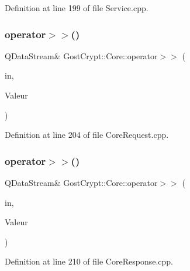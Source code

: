 Definition at line 199 of file Service.\+cpp.

\mbox{\label{namespace_gost_crypt_1_1_core_a3b46d08975fa4cdda6093ecbed9bf751}} 
\subsubsection{\texorpdfstring{operator$>$$>$()}{operator>>()}\hspace{0.1cm}{\footnotesize\ttfamily [36/56]}}
{\footnotesize\ttfamily Q\+Data\+Stream\& Gost\+Crypt\+::\+Core\+::operator$>$$>$ (\begin{DoxyParamCaption}\item[{Q\+Data\+Stream \&}]{in,  }\item[{\hyperlink{struct_gost_crypt_1_1_core_1_1_get_host_devices_request}{Get\+Host\+Devices\+Request} \&}]{Valeur }\end{DoxyParamCaption})}



Definition at line 204 of file Core\+Request.\+cpp.

\mbox{\label{namespace_gost_crypt_1_1_core_a5dc7c6dde9e85efd751ed4261554aaad}} 
\subsubsection{\texorpdfstring{operator$>$$>$()}{operator>>()}\hspace{0.1cm}{\footnotesize\ttfamily [37/56]}}
{\footnotesize\ttfamily Q\+Data\+Stream\& Gost\+Crypt\+::\+Core\+::operator$>$$>$ (\begin{DoxyParamCaption}\item[{Q\+Data\+Stream \&}]{in,  }\item[{\hyperlink{struct_gost_crypt_1_1_core_1_1_mounted_filesystem}{Mounted\+Filesystem} \&}]{Valeur }\end{DoxyParamCaption})}



Definition at line 210 of file Core\+Response.\+cpp.

\mbox{\label{namespace_gost_crypt_1_1_core_a3dc335b2a1a26787ce48830a40944537}} 
